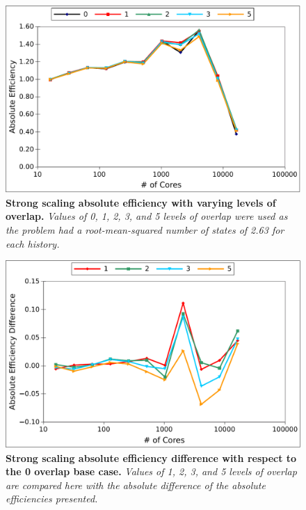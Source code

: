 \begin{figure}[t!]
  \begin{center}
    \includegraphics[width=6in]{chapters/parallel_mc/titan_strong_overlap.pdf}
  \end{center}
  \caption{\textbf{Strong scaling absolute efficiency with varying
      levels of overlap.} \textit{Values of 0, 1, 2, 3, and 5 levels
      of overlap were used as the problem had a root-mean-squared
      number of states of 2.63 for each history.}}
  \label{fig:titan_strong_overlap}
\end{figure}

\begin{figure}[t!]
  \begin{center}
    \includegraphics[width=6in]{chapters/parallel_mc/titan_strong_overlap_diff.pdf}
  \end{center}
  \caption{\textbf{Strong scaling absolute efficiency difference with
      respect to the 0 overlap base case.} \textit{Values of 1, 2, 3,
      and 5 levels of overlap are compared here with the absolute
      difference of the absolute efficiencies presented.}}
  \label{fig:titan_strong_overlap_diff}
\end{figure}

